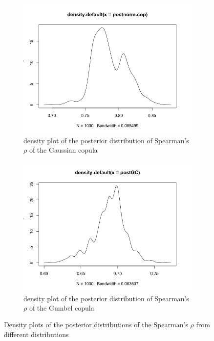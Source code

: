 \documentclass[mstat,12pt]{unswthesis}  %
\numberwithin{equation}{section}
\begin{document}
\begin{figure}[h]
\begin{subfigure}{.5\textwidth}
  \centering
  \includegraphics[width=\linewidth]{postGau.png}  
  \caption{density plot of the posterior distribution of Spearman's $\rho$ of the Gaussian copula}
  \label{fig:sub-third}
\end{subfigure}
\begin{subfigure}{.5\textwidth}
  \centering
  \includegraphics[width=\linewidth]{postGC.png}  
  \caption{density plot of the posterior distribution of Spearman's $\rho$ of the Gumbel copula}
  \label{fig:sub-fourth}
\end{subfigure}
\caption{Density plots of the posterior distributions of the Spearman's $\rho$ from different distributions}
\label{fig:fig}
\end{figure}
\end{document}
